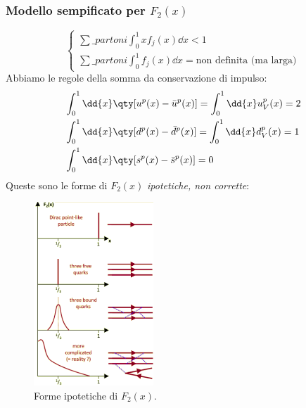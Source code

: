 \subsubsection{Modello sempificato per $F_2(x)$}
\begin{equation*}
	\begin{cases}
\sum\_{partoni}\int_{0}^{1}xf_j(x)\dd{x}<1\\
\sum\_{partoni}\int_{0}^{1}f_j(x)\dd{x}=\text{non definita (ma larga)}
\end{cases}
\end{equation*}
Abbiamo le regole della somma da conservazione di impulso:
\begin{align*}
&\int_{0}^{1}\dd{x}\qty[u^p(x)-\bar u^p(x)]=\int_{0}^{1}\dd {x}u^p_V(x)=2 \\
&\int_{0}^{1}\dd{x}\qty[d^p(x)-\bar d^p(x)]=\int_{0}^{1}\dd{x}d^p_V(x)=1\\
&\int_{0}^{1}\dd{x}\qty[s^p(x)-\bar s^p(x)]=0
\end{align*}
Queste sono le forme di $F_2(x)$ \textit{ipotetiche, non corrette}:
\begin{figure}[H]
    \centering
    \includegraphics[width=0.4\textwidth]{immagini/fig_F_2_forme.png}
    \caption{Forme ipotetiche di $F_2(x)$.}
\end{figure}
